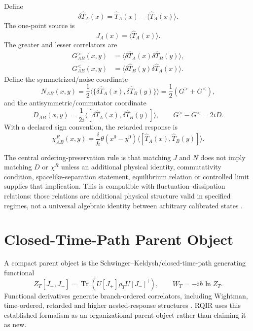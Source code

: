 \documentclass[11pt]{article}
\newcommand{\Tr}{\operatorname{Tr}}
\begin{document}
Define
\begin{equation}
 \delta\hat T_A(x)=\hat T_A(x)-\langle\hat T_A(x)\rangle.
\end{equation}
The one-point source is
\begin{equation}
 J_A(x)=\langle\hat T_A(x)\rangle.
\end{equation}
The greater and lesser correlators are
\begin{align}
 G^>_{AB}(x,y)&=\langle\delta\hat T_A(x)\delta\hat T_B(y)\rangle,\\
 G^<_{AB}(x,y)&=\langle\delta\hat T_B(y)\delta\hat T_A(x)\rangle.
\end{align}
Define the symmetrized/noise coordinate
\begin{equation}
 N_{AB}(x,y)=\frac12\langle\{\delta\hat T_A(x),\delta\hat T_B(y)\}\rangle
 =\frac12(G^>+G^<),
\end{equation}
and the antisymmetric/commutator coordinate
\begin{equation}
 D_{AB}(x,y)=\frac{1}{2i}\langle[\delta\hat T_A(x),\delta\hat T_B(y)]\rangle,
 \qquad G^>-G^<=2iD.
\end{equation}
With a declared sign convention, the retarded response is
\begin{equation}
 \chi^R_{AB}(x,y)=\frac{i}{\hbar}\theta(x^0-y^0)
 \langle[\hat T_A(x),\hat T_B(y)]\rangle.
\end{equation}

The central ordering-preservation rule is that matching $J$ and $N$ does not imply matching $D$ or $\chi^R$ unless an additional physical identity, commutativity condition, spacelike-separation statement, equilibrium relation or controlled limit supplies that implication. This is compatible with fluctuation--dissipation relations: those relations are additional physical structure valid in specified regimes, not a universal algebraic identity between arbitrary calibrated states \cite{Kubo1957}.

\section{Closed-Time-Path Parent Object}

A compact parent object is the Schwinger--Keldysh/closed-time-path generating functional
\begin{equation}
 Z_T[J_+,J_-]=\Tr\!\left(U[J_+]\rho_T U[J_-]^\dagger\right),
 \qquad W_T=-i\hbar\ln Z_T.
\end{equation}
Functional derivatives generate branch-ordered correlators, including Wightman, time-ordered, retarded and higher nested-response structures \cite{FeynmanVernon1963,Keldysh1965}. RQIR uses this established formalism as an organizational parent object rather than claiming it as new.
\end{document}
